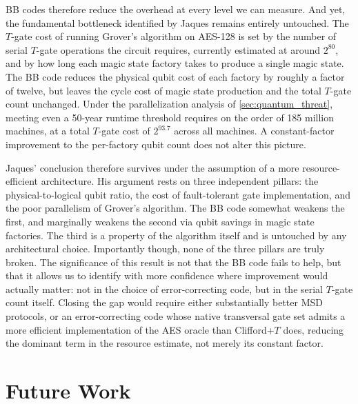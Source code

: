 BB codes therefore reduce the overhead at every level we can measure. And yet, the fundamental bottleneck identified by Jaques remains entirely untouched. The $T$-gate cost of running Grover's algorithm on AES-128 is set by the number of serial $T$-gate operations the circuit requires, currently estimated at around $2^{80}$, and by how long each magic state factory takes to produce a single magic state. The BB code reduces the physical qubit cost of each factory by roughly a factor of twelve, but leaves the cycle cost of magic state production and the total $T$-gate count unchanged. Under the parallelization analysis of \cref{sec:quantum_threat}, meeting even a 50-year runtime threshold requires on the order of 185 million machines, at a total $T$-gate cost of $2^{93.7}$ across all machines. A constant-factor improvement to the per-factory qubit count does not alter this picture.

Jaques' conclusion therefore survives under the assumption of a more resource-efficient architecture. His argument rests on three independent pillars: the physical-to-logical qubit ratio, the cost of fault-tolerant gate implementation, and the poor parallelism of Grover's algorithm. The BB code somewhat weakens the first, and marginally weakens the second via qubit savings in magic state factories. The third is a property of the algorithm itself and is untouched by any architectural choice. Importantly though, none of the three pillars are truly broken. The significance of this result is not that the BB code fails to help, but that it allows us to identify with more confidence where improvement would actually matter: not in the choice of error-correcting code, but in the serial $T$-gate count itself. Closing the gap would require either substantially better MSD protocols, or an error-correcting code whose native transversal gate set admits a more efficient implementation of the AES oracle than Clifford+$T$ does, reducing the dominant term in the resource estimate, not merely its constant factor.



\section{Future Work}\label{subsec:future_work}




